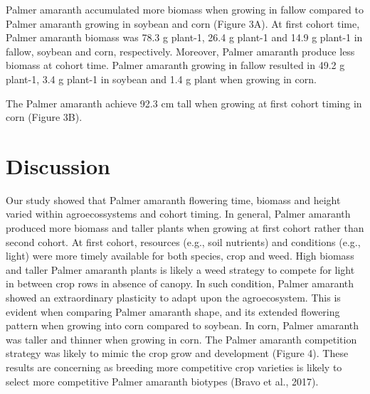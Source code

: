 \documentclass[utf8]{frontiersSCNS}
\begin{document}
Palmer amaranth accumulated more biomass when growing in fallow compared
to Palmer amaranth growing in soybean and corn (Figure 3A). At first
cohort time, Palmer amaranth biomass was 78.3 g plant-1, 26.4 g plant-1
and 14.9 g plant-1 in fallow, soybean and corn, respectively. Moreover,
Palmer amaranth produce less biomass at cohort time. Palmer amaranth
growing in fallow resulted in 49.2 g plant-1, 3.4 g plant-1 in soybean
and 1.4 g plant when growing in corn.

The Palmer amaranth achieve 92.3 cm tall when growing at first cohort
timing in corn (Figure 3B).

\hypertarget{discussion}{%
\section*{Discussion}\label{discussion}}

Our study showed that Palmer amaranth flowering time, biomass and height
varied within agroecossystems and cohort timing. In general, Palmer
amaranth produced more biomass and taller plants when growing at first
cohort rather than second cohort. At first cohort, resources (e.g., soil
nutrients) and conditions (e.g., light) were more timely available for
both species, crop and weed. High biomass and taller Palmer amaranth
plants is likely a weed strategy to compete for light in between crop
rows in absence of canopy. In such condition, Palmer amaranth showed an
extraordinary plasticity to adapt upon the agroecosystem. This is
evident when comparing Palmer amaranth shape, and its extended flowering
pattern when growing into corn compared to soybean. In corn, Palmer
amaranth was taller and thinner when growing in corn. The Palmer
amaranth competition strategy was likely to mimic the crop grow and
development (Figure 4). These results are concerning as breeding more
competitive crop varieties is likely to select more competitive Palmer
amaranth biotypes (Bravo et al., 2017).
\end{document}
